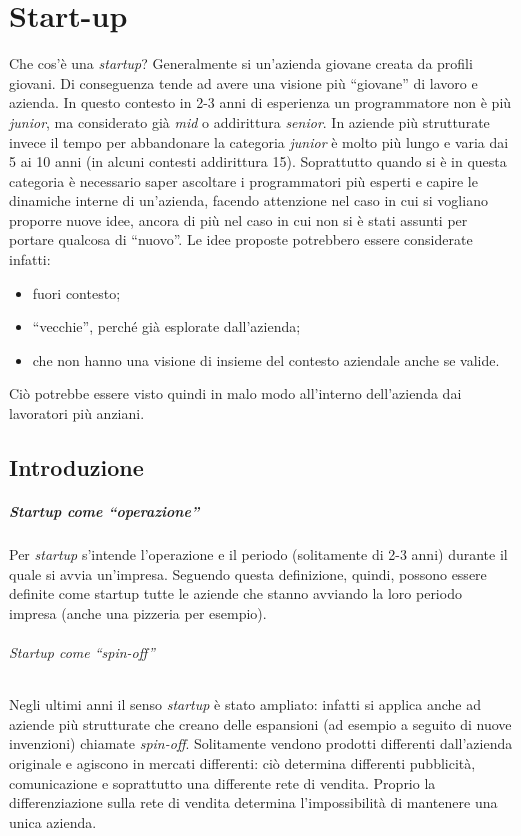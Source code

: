 \chapter{Start-up}

Che cos'è una \textit{startup}? Generalmente si un'azienda giovane creata da
profili giovani. Di conseguenza tende ad avere una visione più ``giovane'' di
lavoro e azienda. In questo contesto in 2-3 anni di esperienza un programmatore
non è più \textit{junior}, ma considerato già \textit{mid} o addirittura
\textit{senior}. In aziende più strutturate invece il tempo per abbandonare la
categoria \textit{junior} è molto più lungo e varia dai 5 ai 10 anni (in alcuni
contesti addirittura 15). Soprattutto quando si è in questa categoria è
necessario saper ascoltare i programmatori più esperti e capire le dinamiche
interne di un'azienda, facendo attenzione nel caso in cui si vogliano proporre
nuove idee, ancora di più nel caso in cui non si è stati assunti per portare
qualcosa di ``nuovo''. Le idee proposte potrebbero essere considerate infatti:
\begin{itemize}
  \item fuori contesto;
  \item ``vecchie'', perché già esplorate dall'azienda;
  \item che non hanno una visione di insieme del contesto aziendale anche se
  valide.
\end{itemize}
Ciò potrebbe essere visto quindi in malo modo all'interno dell'azienda dai
lavoratori più anziani.

\section{Introduzione}

\paragraph*{Startup come ``operazione''} Per \textit{startup} s'intende
l'operazione e il periodo (solitamente di 2-3 anni) durante il quale si avvia
un'impresa. Seguendo questa definizione, quindi, possono essere definite come
startup tutte le aziende che stanno avviando la loro periodo impresa (anche una
pizzeria per esempio).

\subparagraph*{Startup come ``spin-off''}
Negli ultimi anni il senso \textit{startup} è stato ampliato: infatti si
applica anche ad aziende più strutturate che creano delle espansioni (ad
esempio a seguito di nuove invenzioni) chiamate \textit{spin-off}. Solitamente
vendono prodotti differenti dall'azienda originale e agiscono in mercati
differenti: ciò determina differenti pubblicità, comunicazione e soprattutto
una differente rete di vendita. Proprio la differenziazione sulla rete di
vendita determina l'impossibilità di mantenere una unica azienda.

